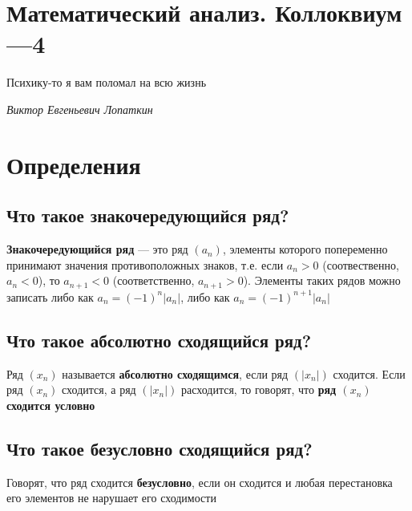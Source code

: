 \documentclass[a4paper]{article}
\begin{document}
\section*{\LARGE{Математический анализ. Коллоквиум—4}}
\epigraph{Психику-то я вам поломал на всю жизнь}%
{\textit{Виктор Евгеньевич Лопаткин}\\ \textsc{}}
\tableofcontents
\newpage
\section{Определения}
\subsection{Что такое знакочередующийся ряд?}
\textbf{Знакочередующийся ряд} — это ряд $(a_n)$, элементы которого попеременно принимают значения противоположных знаков, т.е. если $a_n>0$ (соотвественно, $a_n <0$), то $a_{n+1}<0$ (соответственно, $a_{n+1}>0$). Элементы таких рядов можно записать либо как $a_n  = (-1)^n |a_n|$, либо как $a_n = (-1)^{n+1}|a_n|$

\subsection{Что такое абсолютно сходящийся ряд?}
Ряд $(x_n)$ называется \textbf{абсолютно сходящимся}, если ряд $\left(|x_n|\right)$ сходится. Если ряд $(x_n)$ сходится, а ряд $(|x_n|)$ расходится, то говорят, что \textbf{ряд $(x_n)$ сходится условно}

\subsection{Что такое безусловно сходящийся ряд?}
Говорят, что ряд сходится \textbf{безусловно}, если он сходится и любая перестановка его элементов не нарушает его сходимости
\end{document}
